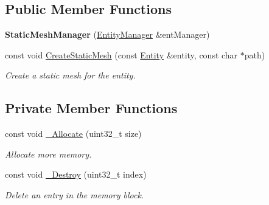 \subsection*{Public Member Functions}
\begin{DoxyCompactItemize}
\item 
{\bfseries Static\+Mesh\+Manager} (\hyperlink{class_ensum_1_1_components_1_1_entity_manager}{Entity\+Manager} \&ent\+Manager)\hypertarget{class_ensum_1_1_components_1_1_static_mesh_manager_a36c1b89e93c9ca37855b709b9e5c8268}{}\label{class_ensum_1_1_components_1_1_static_mesh_manager_a36c1b89e93c9ca37855b709b9e5c8268}

\item 
const void \hyperlink{class_ensum_1_1_components_1_1_static_mesh_manager_a693d1787a0e9e52118e26b66d6d4d01e}{Create\+Static\+Mesh} (const \hyperlink{struct_ensum_1_1_components_1_1_entity}{Entity} \&entity, const char $\ast$path)\hypertarget{class_ensum_1_1_components_1_1_static_mesh_manager_a693d1787a0e9e52118e26b66d6d4d01e}{}\label{class_ensum_1_1_components_1_1_static_mesh_manager_a693d1787a0e9e52118e26b66d6d4d01e}

\begin{DoxyCompactList}\small\item\em Create a static mesh for the entity. \end{DoxyCompactList}\end{DoxyCompactItemize}
\subsection*{Private Member Functions}
\begin{DoxyCompactItemize}
\item 
const void \hyperlink{class_ensum_1_1_components_1_1_static_mesh_manager_a470c7fb98f91c55b803ef8d2dd7a4803}{\+\_\+\+Allocate} (uint32\+\_\+t size)
\begin{DoxyCompactList}\small\item\em Allocate more memory. \end{DoxyCompactList}\item 
const void \hyperlink{class_ensum_1_1_components_1_1_static_mesh_manager_a3d7684a00092ff8d467425a9f1ba7e5c}{\+\_\+\+Destroy} (uint32\+\_\+t index)
\begin{DoxyCompactList}\small\item\em Delete an entry in the memory block. \end{DoxyCompactList}\end{DoxyCompactItemize}
